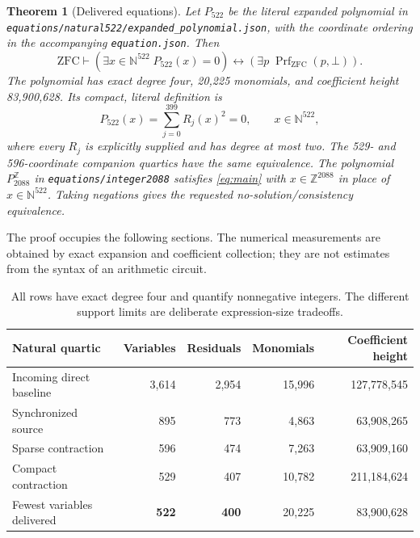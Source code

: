 \documentclass[11pt,letterpaper]{article}
\newtheorem{theorem}{Theorem}[section]
\theoremstyle{definition}\newtheorem{definition}[theorem]{Definition}
\theoremstyle{remark}\newtheorem{remark}[theorem]{Remark}
\newcommand{\N}{\mathbb N}
\newcommand{\Z}{\mathbb Z}
\newcommand{\ZFC}{\mathrm{ZFC}}
\newcommand{\Prf}{\operatorname{Prf}}
\newcommand{\file}[1]{\texttt{\nolinkurl{#1}}}
\newcommand{\pn}{P_{522}}
\newcommand{\pz}{P^{\Z}_{2088}}
\begin{document}
\begin{theorem}[Delivered equations]\label{thm:main}
Let $\pn$ be the literal expanded polynomial in
\file{equations/natural522/expanded_polynomial.json}, with the coordinate
ordering in the accompanying \file{equation.json}. Then
\begin{equation}\label{eq:main}
 \ZFC\vdash
 \left(\exists x\in\N^{522}\;\pn(x)=0\right)
 \longleftrightarrow
 \left(\exists p\;\Prf_{\ZFC}(p,\bot)\right).
\end{equation}
The polynomial has exact degree four, 20,225 monomials, and coefficient
height 83,900,628. Its compact, literal definition is
\begin{equation}\label{eq:sos}
 \boxed{\displaystyle \pn(x)=\sum_{j=0}^{399}R_j(x)^2=0,\qquad x\in\N^{522},}
\end{equation}
where every $R_j$ is explicitly supplied and has degree at most two.
The 529- and 596-coordinate companion quartics have the same equivalence.
The polynomial $\pz$ in \file{equations/integer2088} satisfies
\eqref{eq:main} with $x\in\Z^{2088}$ in place of $x\in\N^{522}$.
Taking negations gives the requested no-solution/consistency equivalence.
\end{theorem}

The proof occupies the following sections. The numerical measurements are
obtained by exact expansion and coefficient collection; they are not
estimates from the syntax of an arithmetic circuit.

\begin{table}[ht]
\centering\small
\begin{tabular}{lrrrr}
\toprule
Natural quartic & Variables & Residuals & Monomials & Coefficient height\\
\midrule
Incoming direct baseline & 3,614 & 2,954 & 15,996 & 127,778,545\\
Synchronized source & 895 & 773 & 4,863 & 63,908,265\\
Sparse contraction & 596 & 474 & 7,263 & 63,909,160\\
Compact contraction & 529 & 407 & 10,782 & 211,184,624\\
Fewest variables delivered & \textbf{522} & \textbf{400} & 20,225 & 83,900,628\\
\bottomrule
\end{tabular}
\caption{All rows have exact degree four and quantify nonnegative integers.
The different support limits are deliberate expression-size tradeoffs.}
\label{tab:frontier}
\end{table}
\end{document}
